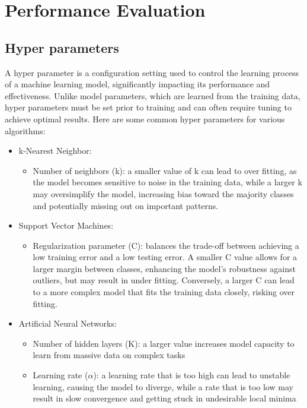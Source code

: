 \documentclass{article}
\begin{document}
\section{Performance Evaluation} 
\subsection{Hyper parameters}
A hyper parameter is a configuration setting used to control the learning process of a machine learning model, significantly impacting its performance and effectiveness. Unlike model parameters, which are learned from the training data, hyper parameters must be set prior to training and can often require tuning to achieve optimal results. Here are some common hyper parameters for various algorithms:
\begin{itemize}
    \item   k-Nearest Neighbor: 
    \begin{itemize}
        \item Number of neighbors (k): a smaller value of k can lead to over fitting, as the model becomes sensitive to noise in the training data, while a larger k may oversimplify the model, increasing bias toward the majority classes and potentially missing out on important patterns. 
    \end{itemize}
    \item Support Vector Machines: 
    \begin{itemize}
        \item Regularization parameter (C): balances the trade-off between achieving a low training error and a low testing error. A smaller C value allows for a larger margin between classes, enhancing the model's robustness against outliers, but may result in under fitting. Conversely, a larger C can lead to a more complex model that fits the training data closely, risking over fitting. 
    \end{itemize}
    \item Artificial Neural Networks: 
    \begin{itemize}
        \item Number of hidden layers (K): a larger value increases model capacity to learn from massive data on complex tasks 
        \item Learning rate ($\alpha$): a learning rate that is too high can lead to unstable learning, causing the model to diverge, while a rate that is too low may result in slow convergence and getting stuck in undesirable local minima
    \end{itemize}


\end{itemize}
\end{document}
